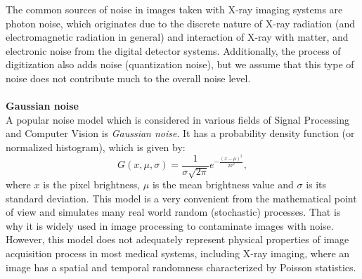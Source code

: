 The common sources of noise in images taken with X-ray imaging systems are photon noise, which originates due to the discrete nature of X-ray radiation (and electromagnetic radiation in general) and interaction of X-ray with matter, and electronic noise from the digital detector systems. Additionally, the process of digitization also adds noise (quantization noise), but we assume that this type of noise does not contribute much to the overall noise level.
\\
\\
\textbf{Gaussian noise}
\\
A popular noise model which is considered in various fields of Signal Processing and Computer Vision is \textit{Gaussian noise}. It has a probability density function (or normalized histogram), which is given by:
$$G(x,\mu, \sigma)= \frac{1}{\sigma \sqrt{2 \pi}} e^{-\frac{(x-\mu)^2}{2\sigma^2}}, $$
where $x$ is the pixel brightness, $\mu$ is the mean brightness value and $\sigma$ is its standard deviation.
This model is a very convenient from the mathematical point of view and simulates many real world random (stochastic) processes. That is why it is widely used in image processing to contaminate images with noise.  However, this model does not adequately represent physical properties of image acquisition process in most medical systems, including X-ray imaging, where an image has a spatial and temporal randomness characterized by Poisson statistics. 

